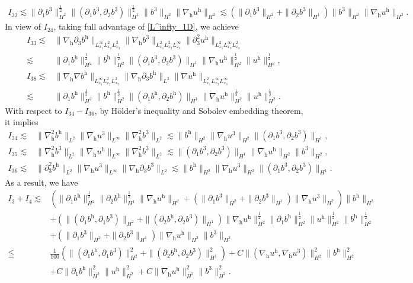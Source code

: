 \documentclass[11pt]{amsart}
\theoremstyle{definition}
\newcommand{\h}{\mathrm{h}}
\newcommand{\nablah}{\nabla_{\mathrm{h}}}
\numberwithin{equation}{section}
\begin{document}
\begin{align*}
	I_{32}\lesssim\|\partial_1b^3\|_{H^2}^\frac12\|(\partial_1b^3,\partial_2b^3)\|_{H^1}^\frac12\|b^3\|_{H^2}\|\nablah u^\h\|_{H^2}
	\lesssim\left(\|\partial_1b^3\|_{H^2}+\|\partial_2b^3\|_{H^1}\right)\|b^3\|_{H^2}\|\nablah u^\h\|_{H^2}.
\end{align*}
In view of $I_{24}$, taking full advantage of  \eqref{L^infty_1D}, we achieve
\begin{align*}
	I_{33}\lesssim &\|\nablah\partial_3b^\h\|_{L^\infty_{x_1}L^2_{x_2}L^2_{x_3}}\|\nablah b^3 \|_{L^2_{x_1}L^2_{x_2}L^\infty_{x_3}}\|\partial_3^2 u^\h \|_{L^2_{x_1}L^\infty_{x_2}L^2_{x_3}}\\
	\lesssim&\|\partial_1b^\h\|_{H^2}^\frac12\|b^\h\|_{H^2}^\frac12\|(\partial_1b^3,\partial_2b^3)\|_{H^1}\|\nablah u^\h\|_{H^2}^\frac12\| u^\h\|_{H^2}^\frac12,\\
	I_{38}\lesssim &\|\nablah\nabla b^\h\|_{L^\infty_{x_1}L^2_{x_2}L^2_{x_3}}\|\nablah\partial_3 b^\h \|_{L^2}\|\nabla u^\h \|_{L^2_{x_1}L^\infty_{x_2}L^\infty_{x_3}}\\
	\lesssim&\|\partial_1b^\h\|_{H^2}^\frac12\|b^\h\|_{H^2}^\frac12\|(\partial_1b^\h,\partial_2b^\h)\|_{H^1}\|\nablah u^\h\|_{H^2}^\frac12\| u^\h\|_{H^2}^\frac12.
\end{align*}
With respect to $I_{34}-I_{36}$, by H\"older's inequality and Sobolev embedding theorem, it implies
\begin{align*}
	I_{34}\lesssim&\|\nablah^2b^\h \|_{L^2}\|\nablah u^3\|_{L^\infty}\|\nablah^2 b^3\|_{L^2}\lesssim\|b^\h \|_{H^2}\|\nablah u^3\|_{H^2}\|(\partial_1b^3,\partial_2b^3)\|_{H^1},\\
	I_{35}\lesssim&\|\nablah^2b^3 \|_{L^2}\|\nablah u^\h\|_{L^\infty}\|\nablah^2 b^3\|_{L^2}\lesssim\|(\partial_1b^3,\partial_2b^3)\|_{H^1}\|\nablah u^\h\|_{H^2}\|b^3 \|_{H^2},\\
	I_{36}\lesssim&\|\partial_3^2b^\h \|_{L^2}\|\nablah u^3\|_{L^\infty}\|\nablah\partial_3 b^3\|_{L^2}\lesssim\|b^\h \|_{H^2}\|\nablah u^3\|_{H^2}\|(\partial_1b^3,\partial_2b^3)\|_{H^1}.
\end{align*}
As a result, we have
\begin{align}\label{I_3,I_4}
	I_{3}+I_{4}\lesssim&\left(\|\partial_1b^\h\|_{H^2}^\frac12\|\partial_2b^\h\|_{H^1}^\frac12\|\nablah u^\h\|_{H^2}+\left(\|\partial_1b^3\|_{H^2}+\|\partial_2b^3\|_{H^1}\right)\|\nablah u^3\|_{H^2}\right)\|b^\h\|_{H^2}\nonumber\\
	&+\left(\|(\partial_1b^\h,\partial_1b^3)\|_{H^2}+\|(\partial_2b^\h,\partial_2b^3)\|_{H^1}\right)\|\nablah u^\h\|_{H^2}^\frac12\|\partial_1b^\h\|_{H^2}^\frac12\| u^\h\|_{H^2}^\frac12\|b^\h\|_{H^2}^\frac12\nonumber\\
	&+\left(\|\partial_1b^3\|_{H^2}+\|\partial_2b^3\|_{H^1}\right)\|\nablah u^\h\|_{H^2}\|b^3 \|_{H^2}\nonumber\\
	\leqq& \frac{1}{100}\left(\|(\partial_1b^\h,\partial_1b^3)\|_{H^2}^2+\|(\partial_2b^\h,\partial_2b^3)\|_{H^1}^2\right)+C\|(\nablah u^\h,\nablah u^3)\|_{H^2}^2\|b^\h\|_{H^2}^2\nonumber\\
	&+C\|\partial_1b^\h\|_{H^2}^2\| u^\h\|_{H^2}^2+C\|\nablah u^\h\|_{H^2}^2\|b^3 \|_{H^2}^2.
\end{align}
\end{document}
